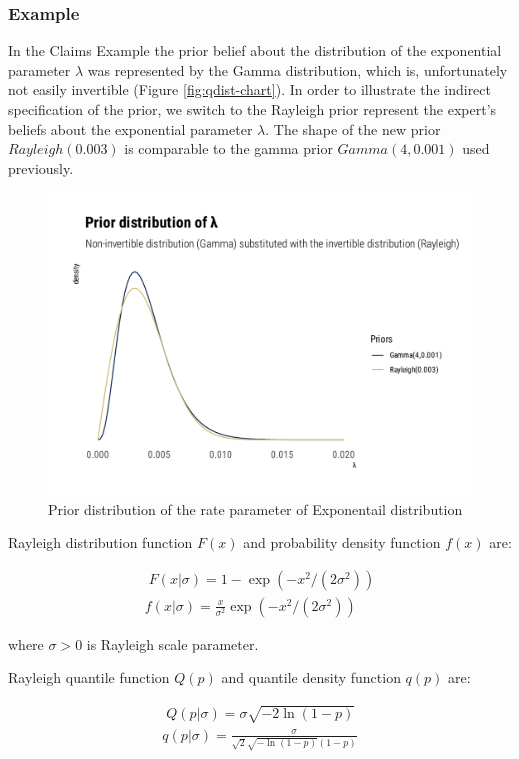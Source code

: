 \documentclass[
  12pt,
]{article}
\begin{document}
\hypertarget{example-1}{%
\subsubsection{Example}\label{example-1}}

In the Claims Example the prior belief about the distribution of the exponential parameter \(\lambda\) was represented by the Gamma distribution, which is, unfortunately not easily invertible (Figure \ref{fig:qdist-chart}). In order to illustrate the indirect specification of the prior, we switch to the Rayleigh prior represent the expert's beliefs about the exponential parameter \(\lambda\). The shape of the new prior \(Rayleigh(0.003)\) is comparable to the gamma prior \(Gamma(4,0.001)\) used previously.

\begin{figure}

{\centering \includegraphics[width=0.5\linewidth]{ilbm_article_files/figure-latex/gamma-ray-prior-graph-1} 

}

\caption{Prior distribution of the rate parameter of Exponentail distribution}\label{fig:gamma-ray-prior-graph}
\end{figure}

Rayleigh distribution function \(F(x)\) and probability density function \(f(x)\) are:

\[ 
\begin{gathered}\;
F(x|\sigma) = 1-\exp(-x^2/(2\sigma^2)) \\ 
f(x|\sigma) = \frac{x}{\sigma^2}\exp(-x^2/(2\sigma^2))
\end{gathered}
\]

where \(\sigma>0\) is Rayleigh scale parameter.

Rayleigh quantile function \(Q(p)\) and quantile density function \(q(p)\) are:

\[
\begin{gathered}\;
Q(p|\sigma)=\sigma\sqrt{-2\ln(1-p)} \\ 
q(p|\sigma)=\frac{\sigma}{\sqrt{2}\sqrt{-\ln(1-p)}(1-p)}
\end{gathered}
\]
\end{document}
